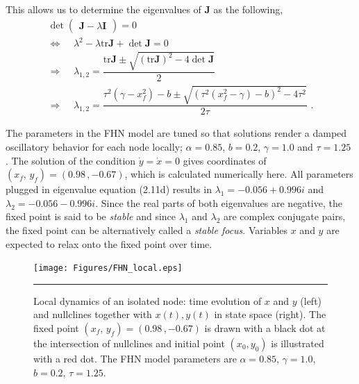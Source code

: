 This allows us to determine the eigenvalues of \textbf{J} as the following,
\begin{subequations}
\begin{align} \det \begin{pmatrix} \textbf{J} - \lambda \textbf{I} \end{pmatrix} = 0
              \label{eqn: frobenius 8}\\  
\Leftrightarrow \;\;\;\; \lambda^2 - \lambda \mathrm{tr} \textbf{J} + \det \textbf{J} = 0
               \label{eqn: frobenius 9} \\
\Rightarrow \;\;\;\; \lambda_{1,2} = \dfrac{\mathrm{tr} \textbf{J} \pm \sqrt{ ( \mathrm{tr}  \textbf{J} )^2 -4 \det \textbf{J} } }{2}               
                \label{eqn: frobenius 10} \\    
\Rightarrow \;\;\;\; \lambda_{1,2} = \dfrac{\tau^2(\gamma - x_f^2)-b \pm \sqrt{(\tau^2(x_f^2-\gamma)-b)^2 - 4 \tau^2 }}{2 \tau} \,\, .
               \label{eqn: frobenius 11}                 
               \end{align} 
\end{subequations}

The parameters in the FHN model are tuned so that solutions render a damped oscillatory behavior for each node locally;  $\alpha = 0.85$, $b=0.2$, $\gamma=1.0$ and $\tau=1.25$ \citep{VUK13}. The solution of the condition $\dot{y}=\dot{x}=0$ gives coordinates of $(x_f, \, y_f) = (0.98 \, , -0.67 )$, which is calculated numerically here. All parameters plugged in eigenvalue equation (2.11d) results in $\lambda_1 = -0.056 + 0.996 i$ and $\lambda_2 = -0.056 - 0.996 i$. Since the real parts of both eigenvalues are negative, the fixed point is said to be \textit{stable} and since $\lambda_1$ and $\lambda_2$ are complex conjugate pairs, the fixed point can be alternatively called a \textit{stable focus}. Variables $x$ and $y$ are expected to relax onto the fixed point over time.  

\begin{figure}[htbp]
  \centering
	\texttt{[image: Figures/FHN\_local.eps]}
 
    \rule{35em}{0.5pt}
    \caption[FHN Local]{Local dynamics of an isolated node: time evolution of $x$ and  $y$ (left) and nullclines together with $x(t),y(t)$ in state space (right). The fixed point $(x_f, \, y_f) = (0.98 \, , -0.67 )$ is drawn with a black dot at the intersection of nullclines and initial point $(x_0, y_0)$ is illustrated with a red dot. The FHN model parameters are $\alpha=0.85$, $\gamma=1.0$, $b=0.2$, $\tau=1.25$. }
  \label{fig:FHN Local}	
\end{figure}

